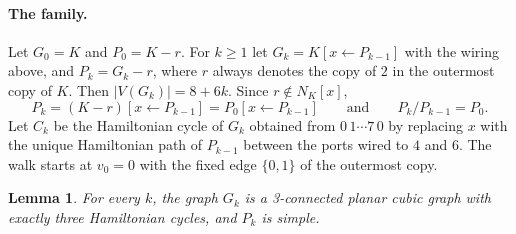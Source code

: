 \documentclass[11pt]{article}
\newtheorem{lemma}[theorem]{Lemma}
\theoremstyle{definition}
\begin{document}
\paragraph{The family.} Let $G_0 = K$ and $P_0 = K - r$. For $k \ge 1$ let
$G_k = K[x \leftarrow P_{k-1}]$ with the wiring above, and $P_k = G_k - r$, where $r$ always denotes
the copy of $2$ in the outermost copy of $K$. Then $|V(G_k)| = 8+6k$. Since $r \notin N_K[x]$,
\[
P_k = (K - r)[x \leftarrow P_{k-1}] = P_0[x \leftarrow P_{k-1}]
\qquad\text{and}\qquad
P_k / P_{k-1} = P_0 .
\]
Let $C_k$ be the Hamiltonian cycle of $G_k$ obtained from $0\,1 \cdots 7\,0$ by replacing $x$ with
the unique Hamiltonian path of $P_{k-1}$ between the ports wired to $4$ and $6$. The walk starts at
$v_0 = 0$ with the fixed edge $\{0,1\}$ of the outermost copy.

\begin{lemma}\label{lem:class}
For every $k$, the graph $G_k$ is a 3-connected planar cubic graph with exactly three Hamiltonian
cycles, and $P_k$ is simple.
\end{lemma}
\end{document}
